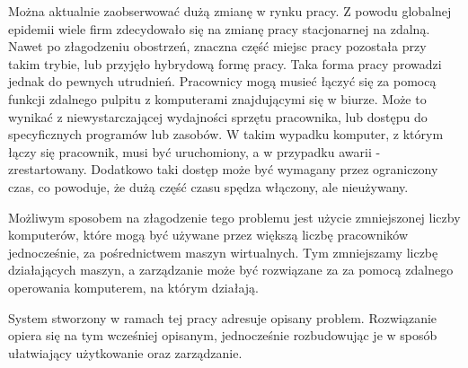 \documentclass[../wstep.tex]{subfiles}
\begin{document}

Można aktualnie zaobserwować dużą zmianę w rynku pracy. Z powodu globalnej epidemii wiele firm zdecydowało się na zmianę pracy stacjonarnej na zdalną. Nawet po złagodzeniu obostrzeń, znaczna część miejsc pracy pozostała przy takim trybie, lub przyjęło hybrydową formę pracy. Taka forma pracy prowadzi jednak do pewnych utrudnień. Pracownicy mogą musieć łączyć się za pomocą funkcji zdalnego pulpitu z komputerami znajdującymi się w biurze. Może to wynikać z niewystarczającej wydajności sprzętu pracownika, lub dostępu do specyficznych programów lub zasobów. W takim wypadku komputer, z którym łączy się pracownik, musi być uruchomiony, a w przypadku awarii - zrestartowany. Dodatkowo taki dostęp może być wymagany przez ograniczony czas, co powoduje, że dużą część czasu spędza włączony, ale nieużywany.

Możliwym sposobem na złagodzenie tego problemu jest użycie zmniejszonej liczby komputerów, które mogą być używane przez większą liczbę pracowników jednocześnie, za pośrednictwem maszyn wirtualnych. Tym zmniejszamy liczbę działających maszyn, a zarządzanie może być rozwiązane za za pomocą zdalnego operowania komputerem, na którym działają.

System stworzony w ramach tej pracy adresuje opisany problem. Rozwiązanie opiera się na tym wcześniej opisanym, jednocześnie rozbudowując je w sposób ułatwiający użytkowanie oraz zarządzanie.
\end{document}
